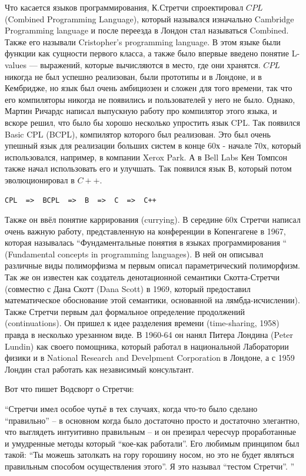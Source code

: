 \documentclass[14pt]{matmex-diploma-custom}
\begin{document}
Что касается языков программирования, К.Стретчи спроектировал $CPL$ (Combined Programming Language), который назывался изначально Cambridge Programming language и после переезда в Лондон стал называться Combined. Также его называли Cristopher’s programming language. В этом языке были функции как сущности первого класса, а также было впервые введено понятие L-values --- выражений, которые вычисляются в место, где они хранятся. $CPL$ никогда не был успешно реализован, были прототипы и в Лондоне, и в Кембридже, но язык был очень амбициозен и сложен для того времени, так что его компиляторы никогда не появились и пользователей у него не было. Однако, Мартин Ричардс написал выпускную работу про компилятор этого языка, и вскоре решил, что было бы хорошо несколько упростить язык CPL. Так появился Basic CPL (BCPL), компилятор которого был реализован. Это был очень упешный язык для реализации больших систем в конце 60х - начале 70х, который использовался, например, в компании Xerox Park. А в Bell Labs Кен Томпсон также начал использовать его и улучшать. Так появился язык $В$, который потом эволюционировал в $C++$.

\begin{verbatim}
CPL  =>  BCPL  =>  B  =>  C  =>  C++
\end{verbatim}

Также он ввёл понятие каррирования (currying). В середине 60х Стретчи написал очень важную работу, представленную на конференции в Копенгагене в 1967, которая называлась  “Фундаментальные понятия в языках программирования “ (Fundamental concepts in programming languages). В ней он описывал различные виды полиморфизма м первым описал параметрический полиморфизм. Так же он известен как создатель денотационной семантики Скотта-Стретчи (совместно с Дана Скотт (Dana Scott) в 1969, который предоставил математическое обоснование этой семантики, основанной на лямбда-исчислении). Также Стретчи первым дал формальное определение продолжений (continuations). Он пришел к идее разделения времени (time-sharing, 1958) правда в несколько урезанном виде. В 1960-64 он нанял Питера Лондина (Peter Lundin) как своего помощника, который работал в национальной Лаборатории физики и в National Research and Develpment Corporation в Лондоне, а с 1959 Лондин стал работать как независимый консультант. 

\begin{framed}
Вот что пишет Водсворт о Стретчи:

“Стретчи имел особое чутьё в тех случаях, когда что-то было сделано “правильно” -- в основном когда было достаточно просто и достаточно элегантно, что выглядеть интуитивно правильным -- и он презирал чересчур проработанные и умудренные методы который “кое-как работали”. Его любимым принципом был такой: “Ты можешь затолкать на гору горошину носом, но это не будет являться правильным способом осуществления этого”. Я это называл “тестом Стретчи”.
”
\end{framed}
\end{document}
